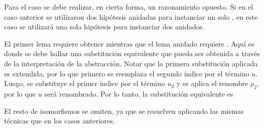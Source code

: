 
Para el caso  se debe realizar, en cierta forma, un razonamiento opuesto.
Si en el caso anterior se utilizaron dos hipótesis anidadas para instanciar un solo , en este caso se utilizará una sola hipótesis para instanciar dos  anidados.

El primer lema requiere obtener
\subst
{ }
{}
mientras que el lema anidado requiere
\subst
{}
{}.
Aquí es donde se debe hallar una substitución equivalente que pueda ser obtenida a través de la interpretación de la abstracción.
Notar que la primera substitución aplicada es extendida, por lo que primero se reemplaza el segundo índice por el término $u$.
Luego, se substituye el primer índice por el término $u_2$ y se aplica el renombre $\rho_2$, por lo que $u$ será renombrado.
Por lo tanto, la substitución equivalente es



El resto de isomorfismos se omiten, ya que se resuelven aplicando las mismas técnicas que en los casos anteriores.





